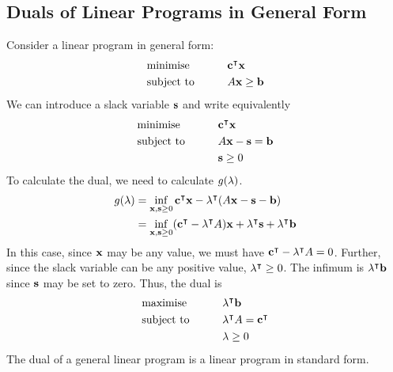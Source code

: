 \subsection{Duals of Linear Programs in General Form}
Consider a linear program in general form:
\begin{alignat*}{2}
	 & \text{minimise}   & \qquad & \vb c^\intercal \vb x \\
	 & \text{subject to} &        & A \vb x \geq \vb b     \\
\end{alignat*}
We can introduce a slack variable \( \vb s \) and write equivalently
\begin{alignat*}{2}
	 & \text{minimise}   & \qquad & \vb c^\intercal \vb x  \\
	 & \text{subject to} &        & A \vb x - \vb s = \vb b \\
	 &                   &        & \vb s \geq 0
\end{alignat*}
To calculate the dual, we need to calculate \( g(\vb \lambda) \).
\begin{align*}
	g(\vb \lambda) & = \inf_{\vb x, \vb s \geq 0} \vb c^\intercal \vb x - \vb \lambda^\intercal (A \vb x - \vb s - \vb b)                                         \\
	               & = \inf_{\vb x, \vb s \geq 0} (\vb c^\intercal - \vb \lambda^\intercal A) \vb x + \vb \lambda^\intercal \vb s + \vb \lambda^\intercal \vb b \\
\end{align*}
In this case, since \( \vb x \) may be any value, we must have \( \vb c^\intercal - \vb \lambda^\intercal A = 0 \).
Further, since the slack variable can be any positive value, \( \vb \lambda^\intercal \geq 0 \).
The infimum is \( \vb \lambda^\intercal \vb b \) since \( \vb s \) may be set to zero.
Thus, the dual is
\begin{alignat*}{2}
	 & \text{maximise}   & \qquad & \vb \lambda^\intercal \vb b                \\
	 & \text{subject to} &        & \vb \lambda^\intercal A = \vb c^\intercal \\
	 &                   &        & \vb \lambda \geq 0
\end{alignat*}
The dual of a general linear program is a linear program in standard form.

